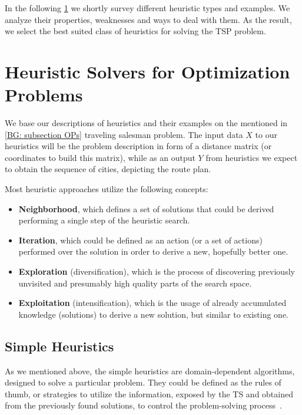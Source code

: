 In the following \cref{bg: section heuristics} we shortly survey different heuristic types and examples. We analyze their properties, weaknesses and ways to deal with them. As the result, we select the best suited class of heuristics for solving the TSP problem.

\section{Heuristic Solvers for Optimization Problems}\label{bg: section heuristics}
We base our descriptions of heuristics and their examples on the mentioned in \cref{BG: subsection OPs} traveling salesman problem. The input data $X$ to our heuristics will be the problem description in form of a distance matrix (or coordinates to build this matrix), while as an output $Y$ from heuristics we expect to obtain the sequence of cities, depicting the route plan.


Most heuristic approaches utilize the following concepts:
\begin{itemize}
	\item \textbf{Neighborhood}, which defines a set of solutions that could be derived performing a single step of the heuristic search.
	\item \textbf{Iteration}, which could be defined as an action (or a set of actions) performed over the solution in order to derive a new, hopefully better one.
	\item \textbf{Exploration} (diversification), which is the process of discovering previously unvisited and presumably high quality parts of the search space.
	\item \textbf{Exploitation} (intensification), which is the usage of already accumulated knowledge (solutions) to derive a new solution, but similar to existing one.
\end{itemize}


\subsection{Simple Heuristics}
As we mentioned above, the simple heuristics are domain-dependent algorithms, designed to solve a particular problem.
They could be defined as the rules of thumb, or strategies to utilize the information, exposed by the TS and obtained from the previously found solutions, to control the problem-solving process~\cite{pearl1984intelligent}. 

